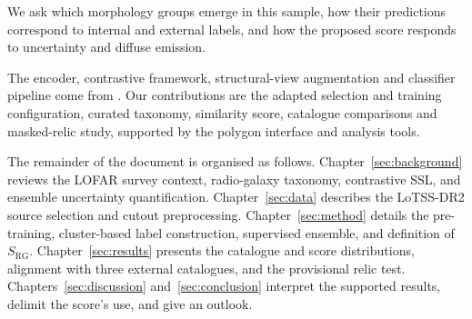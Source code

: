 We ask which morphology groups emerge in this sample, how their predictions correspond to internal and external labels, and how the proposed score responds to uncertainty and diffuse emission.

The encoder, contrastive framework, structural-view augmentation and classifier pipeline come from \citet{Nicolas2025}. Our contributions are the adapted selection and training configuration, curated taxonomy, similarity score, catalogue comparisons and masked-relic study, supported by the polygon interface and analysis tools.

The remainder of the document is organised as follows.
Chapter~\ref{sec:background} reviews the LOFAR survey context, radio-galaxy taxonomy, contrastive SSL, and ensemble uncertainty quantification. Chapter~\ref{sec:data} describes the LoTSS-DR2 source selection and cutout preprocessing. Chapter~\ref{sec:method} details the pre-training, cluster-based label construction, supervised ensemble, and definition of \(S_\mathrm{RG}\).
Chapter~\ref{sec:results} presents the catalogue and score distributions, alignment with three external catalogues, and the provisional relic test. Chapters~\ref{sec:discussion} and~\ref{sec:conclusion} interpret the supported results, delimit the score's use, and give an outlook.
